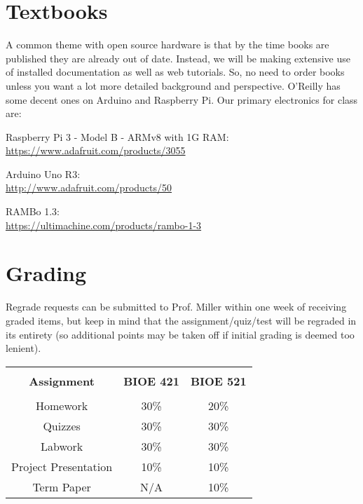 \documentclass[10pt]{article}
\begin{document}
\section*{Textbooks}
A common theme with open source hardware is that by the time books are published they are already out of date. Instead, we will be making extensive use of installed documentation as well as web tutorials. So, no need to order books unless you want a lot more detailed background and perspective. O'Reilly has some decent ones on Arduino and Raspberry Pi. Our primary electronics for class are:

Raspberry Pi 3 - Model B - ARMv8 with 1G RAM:\\
\href{https://www.adafruit.com/products/3055}{https://www.adafruit.com/products/3055}

Arduino Uno R3:\\
\href{http://www.adafruit.com/products/50}{http://www.adafruit.com/products/50}

RAMBo 1.3:\\
\href{https://ultimachine.com/products/rambo-1-3}{https://ultimachine.com/products/rambo-1-3}


\section*{Grading}

Regrade requests can be submitted to Prof. Miller within one week of receiving graded items, but keep in mind that the assignment/quiz/test will be regraded in its entirety (so additional points may be taken off if initial grading is deemed too lenient).

\begin{table}[ht]
\begin{tabular}{c c c}
\hline\hline
\\[-1ex]
\textbf{Assignment} & \textbf{BIOE 421} & \textbf{BIOE 521} \\ [0.5ex]
\hline
\\[-1ex]
Homework				&	30\%	&	20\%	\\[1ex]
Quizzes				&	30\%	&	30\%	\\[1ex]
Labwork					&	30\%	&	30\%	\\[1ex]
Project Presentation	&	10\%	&	10\%	\\[1ex]
Term Paper				&	N/A		&	10\%	\\ [1ex]\hline
\end{tabular}
\label{table:nonlin}
\end{table}
\end{document}
